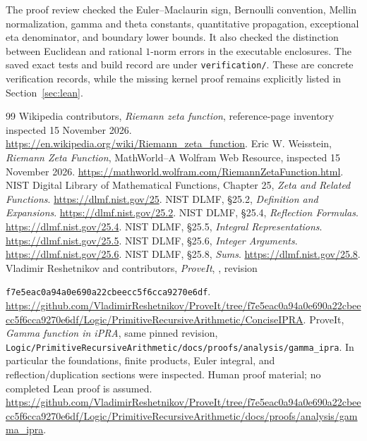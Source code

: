 \documentclass[11pt,letterpaper]{article}
\theoremstyle{definition}
\begin{document}
The proof review checked the Euler--Maclaurin sign, Bernoulli convention,
Mellin normalization, gamma and theta constants, quantitative propagation,
exceptional eta denominator, and boundary lower bounds. It also checked
the distinction between Euclidean and rational $1$-norm errors in the
executable enclosures. The saved exact tests and build record are under
\texttt{verification/}. These are concrete verification records, while
the missing kernel proof remains explicitly listed in Section~\ref{sec:lean}.

\begin{thebibliography}{99}
Wikipedia contributors, \emph{Riemann zeta function}, reference-page
inventory inspected 15 November 2026.
\url{https://en.wikipedia.org/wiki/Riemann_zeta_function}.
Eric W. Weisstein, \emph{Riemann Zeta Function}, MathWorld--A Wolfram Web
Resource, inspected 15 November 2026.
\url{https://mathworld.wolfram.com/RiemannZetaFunction.html}.
NIST Digital Library of Mathematical Functions, Chapter 25,
\emph{Zeta and Related Functions}.
\url{https://dlmf.nist.gov/25}.
NIST DLMF, \S25.2, \emph{Definition and Expansions}.
\url{https://dlmf.nist.gov/25.2}.
NIST DLMF, \S25.4, \emph{Reflection Formulas}.
\url{https://dlmf.nist.gov/25.4}.
NIST DLMF, \S25.5, \emph{Integral Representations}.
\url{https://dlmf.nist.gov/25.5}.
NIST DLMF, \S25.6, \emph{Integer Arguments}.
\url{https://dlmf.nist.gov/25.6}.
NIST DLMF, \S25.8, \emph{Sums}.
\url{https://dlmf.nist.gov/25.8}.
Vladimir Reshetnikov and contributors, \emph{ProveIt},
, revision
\par\texttt{f7e5eac0a94a0e690a22cbeecc5f6cca9270e6df}.
\url{https://github.com/VladimirReshetnikov/ProveIt/tree/f7e5eac0a94a0e690a22cbeecc5f6cca9270e6df/Logic/PrimitiveRecursiveArithmetic/ConciseIPRA}.
ProveIt, \emph{Gamma function in iPRA}, same pinned revision,
\texttt{Logic/PrimitiveRecursiveArithmetic/docs/proofs/analysis/gamma\_ipra}.
In particular the foundations, finite products, Euler integral, and
reflection/duplication sections were inspected. Human proof material;
no completed Lean proof is assumed.
\url{https://github.com/VladimirReshetnikov/ProveIt/tree/f7e5eac0a94a0e690a22cbeecc5f6cca9270e6df/Logic/PrimitiveRecursiveArithmetic/docs/proofs/analysis/gamma_ipra}.
\end{thebibliography}
\end{document}

